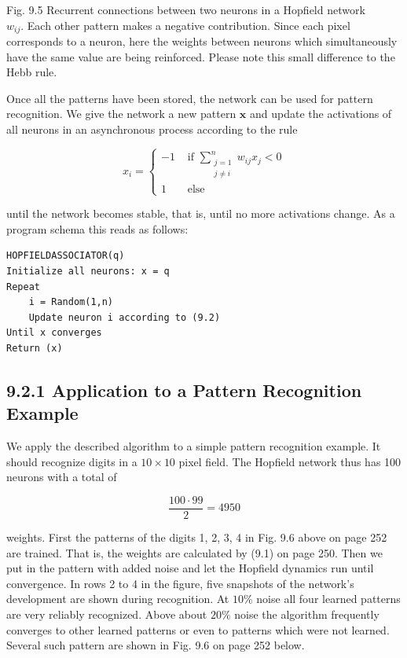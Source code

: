 \documentclass[10pt]{article}
\begin{document}
Fig. 9.5 Recurrent connections between two neurons in a Hopfield network\\

$w_{i j}$. Each other pattern makes a negative contribution. Since each pixel corresponds to a neuron, here the weights between neurons which simultaneously have the same value are being reinforced. Please note this small difference to the Hebb rule.

Once all the patterns have been stored, the network can be used for pattern recognition. We give the network a new pattern $\boldsymbol{x}$ and update the activations of all neurons in an asynchronous process according to the rule

\[
x_{i}= \begin{cases}-1 & \text { if } \sum_{\substack{j=1 \\ j \neq i}}^{n} w_{i j} x_{j}<0  \tag{9.2}\\ 1 & \text { else }\end{cases}
\]

until the network becomes stable, that is, until no more activations change. As a program schema this reads as follows:

\begin{verbatim}
HOPFIELDASSOCIATOR(q)
Initialize all neurons: x = q
Repeat
    i = Random(1,n)
    Update neuron i according to (9.2)
Until x converges
Return (x)
\end{verbatim}

\subsection*{9.2.1 Application to a Pattern Recognition Example}
We apply the described algorithm to a simple pattern recognition example. It should recognize digits in a $10 \times 10$ pixel field. The Hopfield network thus has 100 neurons with a total of

$$
\frac{100 \cdot 99}{2}=4950
$$

weights. First the patterns of the digits 1, 2, 3, 4 in Fig. 9.6 above on page 252 are trained. That is, the weights are calculated by (9.1) on page 250. Then we put in the pattern with added noise and let the Hopfield dynamics run until convergence. In rows 2 to 4 in the figure, five snapshots of the network's development are shown during recognition. At $10 \%$ noise all four learned patterns are very reliably recognized. Above about $20 \%$ noise the algorithm frequently converges to other learned patterns or even to patterns which were not learned. Several such pattern are shown in Fig. 9.6 on page 252 below.
\end{document}
